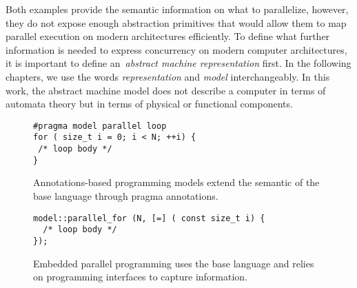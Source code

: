 Both examples provide the semantic information on what to parallelize, however, they do not expose enough abstraction primitives that would allow them to map parallel execution on modern architectures efficiently. To define what further information is needed to express concurrency on modern computer architectures, it is important to define an~\emph{abstract machine representation} first. In the following chapters, we use the words \emph{representation} and \emph{model} interchangeably. In this work, the abstract machine model does not describe a computer in terms of automata theory but in terms of physical or functional components.

\begin{figure}[t!]
\begin{verbatim}
#pragma model parallel loop
for ( size_t i = 0; i < N; ++i) {
 /* loop body */
}
\end{verbatim}
\caption{Annotations-based programming models extend the semantic of the base language through pragma annotations.}
\label{figOMPLike}
\end{figure}

\begin{figure}[t!]
\begin{verbatim}
model::parallel_for (N, [=] ( const size_t i) {
  /* loop body */
});
\end{verbatim}
\caption{Embedded parallel programming uses the base language and relies on programming interfaces to capture information.}
\label{figKokkosLike}
\end{figure}
